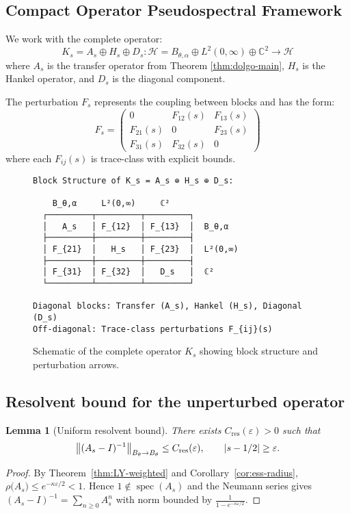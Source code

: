 \documentclass[11pt,a4paper]{article}
\newtheorem{lemma}[theorem]{Lemma}
\theoremstyle{definition}
\theoremstyle{remark}
\DeclareMathOperator{\spec}{spec}
\let\Re\relax
\DeclareMathOperator{\Re}{Re}
\begin{document}
\subsection{Compact Operator Pseudospectral Framework}
We work with the complete operator:
\[
K_s = A_s \oplus H_s \oplus D_s: \mathcal{H} = B_{\theta,\alpha} \oplus L^2(0,\infty) \oplus \mathbb{C}^2 \to \mathcal{H}
\]
where $A_s$ is the transfer operator from Theorem \ref{thm:dolgo-main}, $H_s$ is the Hankel operator, and $D_s$ is the diagonal component.

The perturbation $F_s$ represents the coupling between blocks and has the form:
\[
F_s = \begin{pmatrix} 0 & F_{12}(s) & F_{13}(s) \\ F_{21}(s) & 0 & F_{23}(s) \\ F_{31}(s) & F_{32}(s) & 0 \end{pmatrix}
\]
where each $F_{ij}(s)$ is trace-class with explicit bounds.

\begin{figure}[h]
\centering
\begin{verbatim}
Block Structure of K_s = A_s ⊕ H_s ⊕ D_s:

    B_θ,α     L²(0,∞)     ℂ²
  ┌─────────┬─────────┬─────────┐
  │   A_s   │ F_{12}  │ F_{13}  │  B_θ,α
  ├─────────┼─────────┼─────────┤
  │ F_{21}  │   H_s   │ F_{23}  │  L²(0,∞)
  ├─────────┼─────────┼─────────┤
  │ F_{31}  │ F_{32}  │   D_s   │  ℂ²
  └─────────┴─────────┴─────────┘

Diagonal blocks: Transfer (A_s), Hankel (H_s), Diagonal (D_s)
Off-diagonal: Trace-class perturbations F_{ij}(s)
\end{verbatim}
\caption{Schematic of the complete operator $K_s$ showing block structure and perturbation arrows.}
\end{figure}

\subsection{Resolvent bound for the unperturbed operator}
\begin{lemma}[Uniform resolvent bound]\label{lem:E-res}
There exists $C_{\mathrm{res}}(\varepsilon)>0$ such that
\[
   \bigl\|(A_s-I)^{-1}\bigr\|_{B_{\theta}\to B_{\theta}}
   \le C_{\mathrm{res}}(\varepsilon),\qquad |\Re s-1/2|\ge\varepsilon.
\]
\end{lemma}
\begin{proof}
By Theorem~\ref{thm:LY-weighted} and Corollary~\ref{cor:ess-radius},
$\rho\bigl(A_s\bigr)\le e^{-\kappa\varepsilon/2}<1$.  Hence $1\notin\spec(A_s)$ and the
Neumann series gives $(A_s-I)^{-1}=\sum_{n\ge0}A_s^{n}$ with norm bounded by
$\frac1{1-e^{-\kappa\varepsilon/2}}$.
\end{proof}
\end{document}

